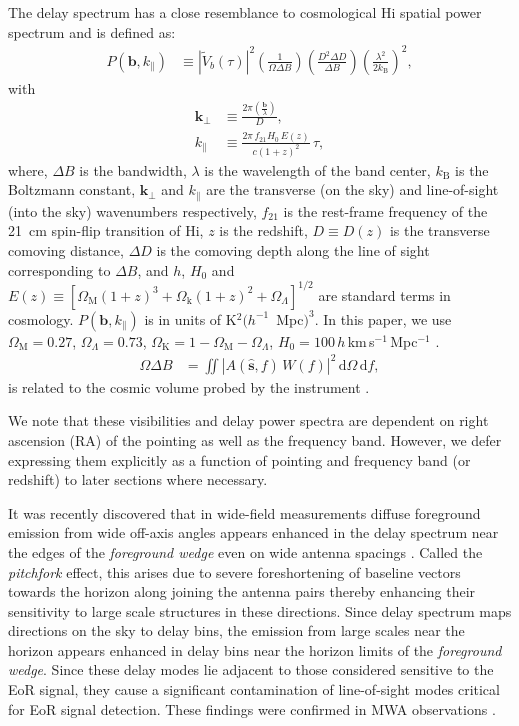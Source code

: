 \documentclass[preprint2,iop,numberedappendix,twocolappendix,appendixfloats]{emulateapj}
\newcommand{\dif}{\mathrm{d}}
\begin{document}
The delay spectrum has a close resemblance to cosmological H{\sc i} spatial power spectrum and is defined as:
\begin{align}\label{eqn:delay-power-spectrum}
  P(\boldsymbol{b},k_\parallel) &\equiv |\tilde{V}_b(\tau)|^2\left(\frac{1}{\Omega\Delta B}\right)\left(\frac{D^2\Delta D}{\Delta B}\right)\left(\frac{\lambda^2}{2k_\textrm{B}}\right)^2,
\end{align}
with
\begin{align}
  \boldsymbol{k}_\perp &\equiv \frac{2\pi(\frac{\boldsymbol{b}}{\lambda})}{D}, \label{eqn:kperp-baseline}\\
  k_\parallel &\equiv \frac{2\pi\,f_{21}H_0\,E(z)}{c(1+z)^2}\,\tau, \label{eqn:kprll-delay}
\end{align}
where, $\Delta B$ is the bandwidth, $\lambda$ is the wavelength of the band center, $k_\textrm{B}$ is the Boltzmann constant, $\boldsymbol{k}_\perp$ and $k_\parallel$ are the transverse (on the sky) and line-of-sight (into the sky) wavenumbers respectively, $f_{21}$ is the rest-frame frequency of the 21~cm spin-flip transition of H{\sc i}, $z$ is the redshift, $D\equiv D(z)$ is the transverse comoving distance, $\Delta D$ is the comoving depth along the line of sight corresponding to $\Delta B$, and $h$, $H_0$ and $E(z)\equiv [\Omega_\textrm{M}(1+z)^3+\Omega_\textrm{k}(1+z)^2+\Omega_\Lambda]^{1/2}$ are standard terms in cosmology. $P(\boldsymbol{b},k_\parallel)$ is in units of K$^2 (h^{-1}$~Mpc$)^3$. In this paper, we use $\Omega_\textrm{M}=0.27$, $\Omega_\Lambda=0.73$, $\Omega_\textrm{K}=1-\Omega_\textrm{M}-\Omega_\Lambda$, $H_0=100\,h\,$km$\,$s$^{-1}\,$Mpc$^{-1}$ \citep{wmap9cosmo}. 
\begin{align}
  \Omega\Delta B &= \iint \left|A(\hat{\boldsymbol{s}},f)\,W(f)\right|^2\,\dif\Omega\,\dif f,
\end{align}
is related to the cosmic volume probed by the instrument \citep[see appendix of][]{par14}. 

We note that these visibilities and delay power spectra are dependent on right ascension (RA) of the pointing as well as the frequency band. However, we defer expressing them explicitly as a function of pointing and frequency band (or redshift) to later sections where necessary.

It was recently discovered that in wide-field measurements diffuse foreground emission from wide off-axis angles appears enhanced in the delay spectrum near the edges of the {\it foreground wedge} even on wide antenna spacings \citep{thy15a}. Called the {\it pitchfork} effect, this arises due to severe foreshortening of baseline vectors towards the horizon along joining the antenna pairs thereby enhancing their sensitivity to large scale structures in these directions. Since delay spectrum maps directions on the sky to delay bins, the emission from large scales near the horizon appears enhanced in delay bins near the horizon limits of the {\it foreground wedge}. Since these delay modes lie adjacent to those considered sensitive to the EoR signal, they cause a significant contamination of line-of-sight modes critical for EoR signal detection. These findings were confirmed in MWA observations \citep{thy15b}.
\end{document}

